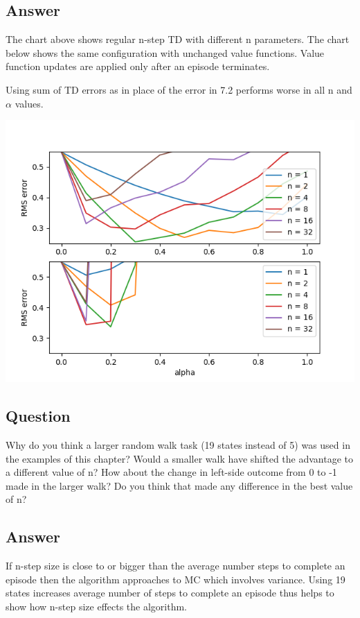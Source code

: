 \documentclass[11pt]{article}
\begin{document}
    \subsection*{Answer}

    The chart above shows regular n-step TD with different n parameters.
    The chart below shows the same configuration with unchanged value functions.
    Value function updates are applied only after an episode terminates.

    Using sum of TD errors as in place of the error in 7.2 performs worse in all n and $\alpha$ values.

    \includegraphics[scale=1]{figure_7_2}

    \subsection{Question}

    Why do you think a larger random walk task (19 states instead of 5) was used in the examples of this chapter?
    Would a smaller walk have shifted the advantage to a different value of n?
    How about the change in left-side outcome from 0 to -1 made in the larger walk?
    Do you think that made any difference in the best value of n?

    \subsection*{Answer}

    If n-step size is close to or bigger than the average number steps to complete an episode then the algorithm approaches to MC which involves variance.
    Using 19 states increases average number of steps to complete an episode thus helps to show how n-step size effects the algorithm.
\end{document}

